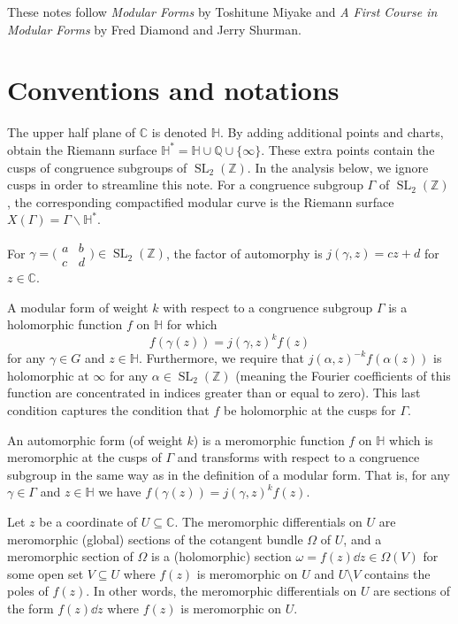 \documentclass[11pt,leqno]{article}
\theoremstyle{plain}
\theoremstyle{definition}
\numberwithin{equation}{section}
\numberwithin{lem}{section}
\DeclareMathOperator{\SL}{SL}
\begin{document}
These notes follow \textit{Modular Forms} by Toshitune Miyake and \textit{A First Course in Modular Forms} by Fred Diamond and Jerry Shurman.

\section{Conventions and notations}

The upper half plane of $\mathbb C$ is denoted $\mathbb H$. By adding additional points and charts, obtain the Riemann surface $\mathbb H^\ast = \mathbb H\cup \mathbb Q\cup \{\infty\}$. These extra points contain the cusps of congruence subgroups of $\SL_2(\mathbb Z)$. In the analysis below, we ignore cusps in order to streamline this note. For a congruence subgroup $\Gamma$ of $\SL_2(\mathbb Z)$, the corresponding compactified modular curve is the Riemann surface $X(\Gamma) = \Gamma\backslash\mathbb H^\ast$.

For $\gamma = \bigl(\!\begin{smallmatrix}
    a & b \\ c & d
\end{smallmatrix}\!\bigr)\in \SL_2(\mathbb Z)$, the factor of automorphy is $j(\gamma,z) = cz+d$ for $z\in\mathbb C$.

A modular form of weight $k$ with respect to a congruence subgroup $\Gamma$ is a holomorphic function $f$ on $\mathbb H$ for which 
\[f(\gamma(z))=j(\gamma,z)^kf(z)\]
for any $\gamma\in G$ and $z\in\mathbb H$. Furthermore, we require that $j(\alpha,z)^{-k}f(\alpha(z))$ is holomorphic at $\infty$ for any $\alpha\in\SL_2(\mathbb Z)$ (meaning the Fourier coefficients of this function are concentrated in indices greater than or equal to zero). This last condition captures the condition that $f$ be holomorphic at the cusps for $\Gamma$.

An automorphic form (of weight $k$) is a meromorphic function $f$ on $\mathbb H$ which is meromorphic at the cusps of $\Gamma$ and transforms with respect to a congruence subgroup in the same way as in the definition of a modular form. That is, for any $\gamma\in \Gamma$ and $z\in\mathbb H$ we have $f(\gamma(z))=j(\gamma,z)^kf(z)$.



Let $z$ be a coordinate of $U\subseteq \mathbb C$. The meromorphic differentials on $U$ are meromorphic (global) sections of the cotangent bundle $\Omega$ of $U$, and a meromorphic section of $\Omega$ is a (holomorphic) section $\omega = f(z)\dd z\in \Omega(V)$ for some open set $V\subseteq U$ where $f(z)$ is meromorphic on $U$ and $U\setminus V$ contains the poles of $f(z)$. In other words, the meromorphic differentials on $U$ are sections of the form $f(z)\dd z$ where $f(z)$ is meromorphic on $U$.
\end{document}

